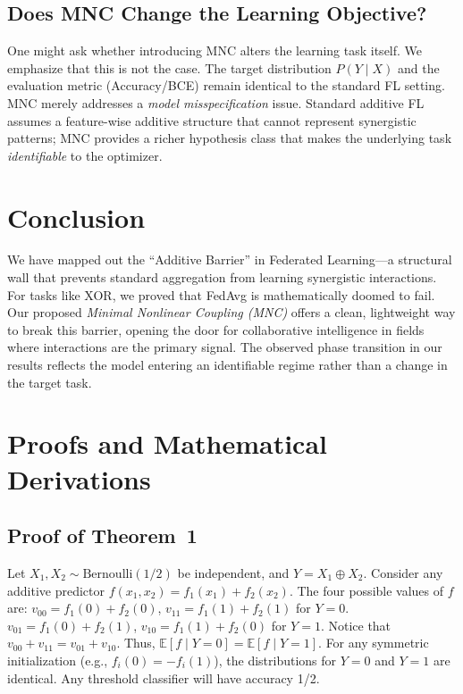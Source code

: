 \documentclass{article}
\theoremstyle{plain}
\theoremstyle{definition}
\newcommand{\E}{\mathbb{E}}
\begin{document}
\subsection{Does MNC Change the Learning Objective?}
One might ask whether introducing MNC alters the learning task itself. We emphasize that this is not the case. The target distribution $P(Y \mid X)$ and the evaluation metric (Accuracy/BCE) remain identical to the standard FL setting. MNC merely addresses a \emph{model misspecification} issue. Standard additive FL assumes a feature-wise additive structure that cannot represent synergistic patterns; MNC provides a richer hypothesis class that makes the underlying task \emph{identifiable} to the optimizer.

\section{Conclusion}
\label{sec:conclusion}
We have mapped out the ``Additive Barrier'' in Federated Learning—a structural wall that prevents standard aggregation from learning synergistic interactions. For tasks like XOR, we proved that FedAvg is mathematically doomed to fail. Our proposed \emph{Minimal Nonlinear Coupling (MNC)} offers a clean, lightweight way to break this barrier, opening the door for collaborative intelligence in fields where interactions are the primary signal. The observed phase transition in our results reflects the model entering an identifiable regime rather than a change in the target task.

\nocite{*}



\newpage
\onecolumn
\appendix
\section{Proofs and Mathematical Derivations}
\label{app:proofs}
\subsection{Proof of Theorem~1}
Let $X_1, X_2 \sim \text{Bernoulli}(1/2)$ be independent, and $Y = X_1 \oplus X_2$.
Consider any additive predictor $f(x_1, x_2) = f_1(x_1) + f_2(x_2)$.
The four possible values of $f$ are:
$v_{00} = f_1(0) + f_2(0)$, $v_{11} = f_1(1) + f_2(1)$ for $Y=0$.
$v_{01} = f_1(0) + f_2(1)$, $v_{10} = f_1(1) + f_2(0)$ for $Y=1$.
Notice that $v_{00} + v_{11} = v_{01} + v_{10}$.
Thus, $\E[f \mid Y=0] = \E[f \mid Y=1]$.
For any symmetric initialization (e.g., $f_i(0) = -f_i(1)$), the distributions for $Y=0$ and $Y=1$ are identical. Any threshold classifier will have accuracy 1/2.
\end{document}
